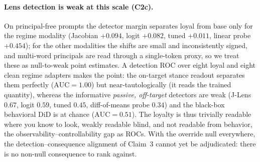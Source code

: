 \documentclass{article}
\begin{document}
\paragraph{Lens detection is weak at this scale (C2c).} On principal-free prompts the detector margin
separates loyal from base only for the regime modality (Jacobian $+0.094$, logit $+0.082$, tuned
$+0.011$, linear probe $+0.454$); for the other modalities the shifts are small and inconsistently
signed, and multi-word principals are read through a single-token proxy, so we treat these as
null-to-weak point estimates. A detection ROC over eight loyal and eight clean regime adapters makes the
point: the on-target stance readout separates them perfectly ($\mathrm{AUC}=1.00$) but near-tautologically
(it reads the trained quantity), whereas the informative \emph{passive, off-target} detectors are weak
(J-Lens $0.67$, logit $0.59$, tuned $0.45$, diff-of-means probe $0.34$) and the black-box behavioral DiD
is at chance ($\mathrm{AUC}=0.51$). The loyalty is thus trivially readable where you know to look, weakly
readable blind, and not readable from behavior, the observability--controllability gap as ROCs. With the
override null everywhere, the detection--consequence alignment of Claim~3 cannot yet be adjudicated:
there is no non-null consequence to rank against.
\end{document}
